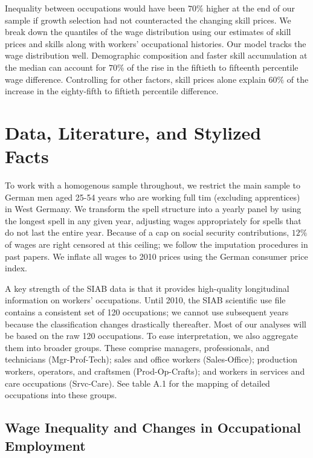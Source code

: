 \documentclass[12pt]{article}
\newcommand{\highlightP}[1]{{\emph{\color{MyPink}{#1}}}}
\theoremstyle{definition}
\begin{document}
\highlightP{Our third findings is that changes in occupational skill prices have driven much of the increase in wage inequality over the past decades.} Inequality between occupations would have been $70\%$ higher at the end of our sample if growth selection had not counteracted the changing skill prices. We break down the quantiles of the wage distribution using our estimates of skill prices and skills along with workers' occupational histories. Our model tracks the wage distribution well. Demographic composition and faster skill accumulation at the median can account for $70\%$ of the rise in the fiftieth to fifteenth percentile wage difference. Controlling for other factors, skill prices alone explain $60\%$ of the increase in the eighty-fifth to fiftieth percentile difference.

\section{Data, Literature, and Stylized Facts}

To work with a homogenous sample throughout, we restrict the main sample to German men aged 25-54 years who are working full tim (excluding apprentices) in West Germany. We transform the spell structure into a yearly panel by using the longest spell in any given year, adjusting wages appropriately for spells that do not last the entire year. Because of a cap on social security contributions, $12\%$ of wages are right censored at this ceiling; we follow the imputation procedures in past papers. We inflate all wages to 2010 prices using the German consumer price index.

A key strength of the SIAB data is that it provides high-quality longitudinal information on workers' occupations. Until 2010, the SIAB scientific use file contains a consistent set of 120 occupations; we cannot use subsequent years because the classification changes drastically thereafter. Most of our analyses will be based on the raw 120 occupations. To ease interpretation, we also aggregate them into broader groups. These comprise managers, professionals, and technicians (Mgr-Prof-Tech); sales and office workers (Sales-Office); production workers, operators, and craftsmen (Prod-Op-Crafts); and workers in services and care occupations (Srvc-Care). See table A.1 for the mapping of detailed occupations into these groups.

\subsection{Wage Inequality and Changes in Occupational Employment}
\end{document}
